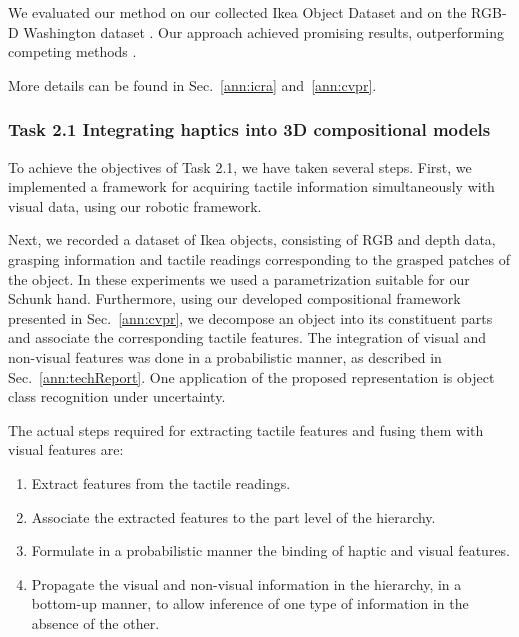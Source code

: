 \documentclass[a4paper,11pt,pdf]{pacmanreport}
\begin{document}
We evaluated our method on our collected Ikea Object Dataset and on the RGB-D Washington dataset \cite{rgbd-dataset}. Our approach achieved promising results, outperforming competing methods \cite{rel7}.

More details can be found in Sec.~\ref{ann:icra} and~\ref{ann:cvpr}. %


\subsubsection{Task 2.1 Integrating haptics into 3D compositional models}

To achieve the objectives of Task 2.1, we have taken several steps. First, we implemented a framework for acquiring tactile information simultaneously with visual data, using our robotic framework. 

Next, we recorded a dataset of Ikea objects, consisting of RGB and depth data, grasping information and tactile readings corresponding to the grasped patches of the object. In these experiments we used a parametrization suitable for our Schunk hand. Furthermore, using our developed compositional framework presented in Sec.~\ref{ann:cvpr}, we decompose an object into its constituent parts and associate the corresponding tactile features. The integration of visual and non-visual features was done in a probabilistic manner, as described in Sec.~\ref{ann:techReport}. One application of the proposed representation is object class recognition under uncertainty.

The actual steps required for extracting tactile features and fusing them with visual features are:
\begin{enumerate}

\item Extract features from the tactile readings.
\item Associate the extracted features to the part level of the hierarchy.
\item Formulate in a probabilistic manner the binding of haptic and visual features.
\item Propagate the visual and non-visual information in the
  hierarchy, in a bottom-up manner, to allow inference of one type of
  information in the absence of the other.
\end{enumerate}
\end{document}
